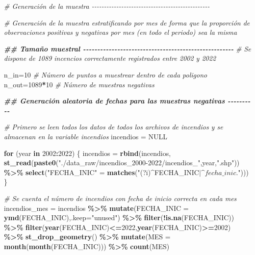 \documentclass[12pt,a4paper,]{book}
\newenvironment{Shaded}{\begin{snugshade}}{\end{snugshade}}
\newcommand{\AttributeTok}[1]{\textcolor[rgb]{0.13,0.29,0.53}{#1}}
\newcommand{\CommentTok}[1]{\textcolor[rgb]{0.56,0.35,0.01}{\textit{#1}}}
\newcommand{\ConstantTok}[1]{\textcolor[rgb]{0.56,0.35,0.01}{#1}}
\newcommand{\ControlFlowTok}[1]{\textcolor[rgb]{0.13,0.29,0.53}{\textbf{#1}}}
\newcommand{\DecValTok}[1]{\textcolor[rgb]{0.00,0.00,0.81}{#1}}
\newcommand{\DocumentationTok}[1]{\textcolor[rgb]{0.56,0.35,0.01}{\textbf{\textit{#1}}}}
\newcommand{\FunctionTok}[1]{\textcolor[rgb]{0.13,0.29,0.53}{\textbf{#1}}}
\newcommand{\NormalTok}[1]{#1}
\newcommand{\OtherTok}[1]{\textcolor[rgb]{0.56,0.35,0.01}{#1}}
\newcommand{\SpecialCharTok}[1]{\textcolor[rgb]{0.81,0.36,0.00}{\textbf{#1}}}
\newcommand{\StringTok}[1]{\textcolor[rgb]{0.31,0.60,0.02}{#1}}
\numberwithin{dummy}{section}
\theoremstyle{ocrenumbox}
\theoremstyle{blacknumex}
\theoremstyle{blacknumbox}
\theoremstyle{ocrenum}
\theoremstyle{ocrenum}
\begin{document}
\begin{Shaded}
\begin{Highlighting}[]
\CommentTok{\# Generación de la muestra {-}{-}{-}{-}{-}{-}{-}{-}{-}{-}{-}{-}{-}{-}{-}{-}{-}{-}{-}{-}{-}{-}{-}{-}{-}{-}{-}{-}{-}{-}{-}{-}{-}{-}{-}{-}{-}{-}{-}{-}{-}{-}{-}{-}{-}{-}{-}{-}}

\CommentTok{\# Generación de la muestra estratificando por mes de forma que la proporción de observaciones positivas y negativas por mes (en todo el periodo) sea la misma}

\DocumentationTok{\#\#  Tamaño muestral {-}{-}{-}{-}{-}{-}{-}{-}{-}{-}{-}{-}{-}{-}{-}{-}{-}{-}{-}{-}{-}{-}{-}{-}{-}{-}{-}{-}{-}{-}{-}{-}{-}{-}{-}{-}{-}{-}{-}{-}{-}{-}{-}{-}{-}{-}{-}{-}{-}{-}{-}{-}{-}}
\CommentTok{\# Se dispone de 1089 incencios correctamente registrados entre 2002 y 2022}

\NormalTok{n\_in}\OtherTok{=}\DecValTok{10} \CommentTok{\# Número de puntos a muestrear dentro de cada poligono}
\NormalTok{n\_out}\OtherTok{=}\DecValTok{1089}\SpecialCharTok{*}\DecValTok{10} \CommentTok{\# Número de muestras negativas}

\DocumentationTok{\#\#  Generación aleatoria de fechas para las muestras negativas {-}{-}{-}{-}{-}{-}{-}{-}{-}{-}}

\CommentTok{\# Primero se leen todos los datos de todos los archivos de incendios y se almacenan en la variable incendios}
\NormalTok{incendios }\OtherTok{=} \ConstantTok{NULL}

\ControlFlowTok{for}\NormalTok{ (year }\ControlFlowTok{in} \DecValTok{2002}\SpecialCharTok{:}\DecValTok{2022}\NormalTok{) \{}
\NormalTok{  incendios }\OtherTok{=} \FunctionTok{rbind}\NormalTok{(incendios, }
                    \FunctionTok{st\_read}\NormalTok{(}\FunctionTok{paste0}\NormalTok{(}\StringTok{"./data\_raw/incendios\_2000{-}2022/incendios\_"}\NormalTok{,year,}\StringTok{".shp"}\NormalTok{)) }\SpecialCharTok{\%\textgreater{}\%} 
                      \FunctionTok{select}\NormalTok{(}\StringTok{"FECHA\_INIC"} \OtherTok{=} \FunctionTok{matches}\NormalTok{(}\StringTok{"(?i)\^{}FECHA\_INIC$|\^{}fecha\_inic.$"}\NormalTok{))) }
\NormalTok{\}}

\CommentTok{\# Se cuenta el número de incendios con fecha de inicio correcta en cada mes}
\NormalTok{incendios\_mes }\OtherTok{=}\NormalTok{ incendios }\SpecialCharTok{\%\textgreater{}\%} 
  \FunctionTok{mutate}\NormalTok{(}\AttributeTok{FECHA\_INIC =} \FunctionTok{ymd}\NormalTok{(FECHA\_INIC),}\AttributeTok{.keep=}\StringTok{"unused"}\NormalTok{) }\SpecialCharTok{\%\textgreater{}\%} 
  \FunctionTok{filter}\NormalTok{(}\SpecialCharTok{!}\FunctionTok{is.na}\NormalTok{(FECHA\_INIC)) }\SpecialCharTok{\%\textgreater{}\%} 
  \FunctionTok{filter}\NormalTok{(}\FunctionTok{year}\NormalTok{(FECHA\_INIC)}\SpecialCharTok{\textless{}=}\DecValTok{2022}\NormalTok{,}\FunctionTok{year}\NormalTok{(FECHA\_INIC)}\SpecialCharTok{\textgreater{}=}\DecValTok{2002}\NormalTok{) }\SpecialCharTok{\%\textgreater{}\%} 
  \FunctionTok{st\_drop\_geometry}\NormalTok{() }\SpecialCharTok{\%\textgreater{}\%} 
  \FunctionTok{mutate}\NormalTok{(}\AttributeTok{MES =} \FunctionTok{month}\NormalTok{(}\FunctionTok{month}\NormalTok{(FECHA\_INIC))) }\SpecialCharTok{\%\textgreater{}\%} 
  \FunctionTok{count}\NormalTok{(MES) }


\end{Highlighting}
\end{Shaded}
\end{document}

